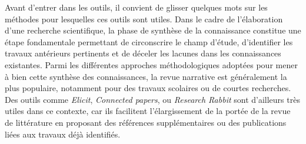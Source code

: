 \documentclass[
  letterpaper,
  DIV=11,
  numbers=noendperiod]{scrreprt}
\begin{document}
Avant d'entrer dans les outils, il convient de glisser quelques mots sur
les méthodes pour lesquelles ces outils sont utiles. Dans le cadre de
l'élaboration d'une recherche scientifique, la phase de synthèse de la
connaissance constitue une étape fondamentale permettant de circonscrire
le champ d'étude, d'identifier les travaux antérieurs pertinents et de
déceler les lacunes dans les connaissances existantes. Parmi les
différentes approches méthodologiques adoptées pour mener à bien cette
synthèse des connaissances, la revue narrative est généralement la plus
populaire, notamment pour des travaux scolaires ou de courtes
recherches. Des outils comme \emph{Elicit}, \emph{Connected papers}, ou
\emph{Research Rabbit} sont d'ailleurs très utiles dans ce contexte, car
ils facilitent l'élargissement de la portée de la revue de littérature
en proposant des références supplémentaires ou des publications liées
aux travaux déjà identifiés.
\end{document}
